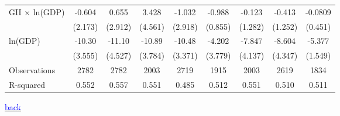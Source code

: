 \documentclass[10pt,letterpaper,subeqn]{beamer}
\begin{document}
\begin{frame}[plain,label=placebo3]
\begin{table}[htbp]
{\begin{tabular}{l*{8}{c}}
GII $\times$ ln(GDP)     &      -0.604         &       0.655         &       3.428         &      -1.032         &      -0.988         &      -0.123         &      -0.413         &     -0.0809         \\
            &     (2.173)         &     (2.912)         &     (4.561)         &     (2.918)         &     (0.855)         &     (1.282)         &     (1.252)         &     (0.451)         \\

ln(GDP)         &      -10.30\sym{***}&      -11.10\sym{**} &      -10.89\sym{***}&      -10.48\sym{***}&      -4.202         &      -7.847\sym{*}  &      -8.604\sym{*}  &      -5.377\sym{***}\\
            &     (3.555)         &     (4.527)         &     (3.784)         &     (3.371)         &     (3.779)         &     (4.137)         &     (4.347)         &     (1.549)         \\
\hline
Observations      &        2782         &        2782         &        2003         &        2719         &        1915         &        2003         &        2619         &        1834         \\
R-squared          &       0.552         &       0.557         &       0.551         &       0.485         &       0.512         &       0.551         &       0.510         &       0.511         \\
\hline\hline
\end{tabular}}\end{table}

{\footnotesize \hyperlink{placebos}{\textcolor{blue}{back}}}
\end{frame}
\end{document}
